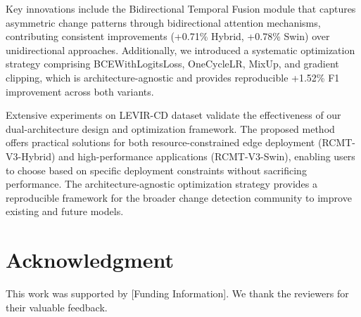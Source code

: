 \documentclass[journal]{IEEEtran}
\begin{document}
Key innovations include the Bidirectional Temporal Fusion module that captures asymmetric change patterns through bidirectional attention mechanisms, contributing consistent improvements (+0.71\% Hybrid, +0.78\% Swin) over unidirectional approaches. Additionally, we introduced a systematic optimization strategy comprising BCEWithLogitsLoss, OneCycleLR, MixUp, and gradient clipping, which is architecture-agnostic and provides reproducible +1.52\% F1 improvement across both variants.

Extensive experiments on LEVIR-CD dataset validate the effectiveness of our dual-architecture design and optimization framework. The proposed method offers practical solutions for both resource-constrained edge deployment (RCMT-V3-Hybrid) and high-performance applications (RCMT-V3-Swin), enabling users to choose based on specific deployment constraints without sacrificing performance. The architecture-agnostic optimization strategy provides a reproducible framework for the broader change detection community to improve existing and future models.

\section*{Acknowledgment}

This work was supported by [Funding Information]. We thank the reviewers for their valuable feedback.



\end{document}
